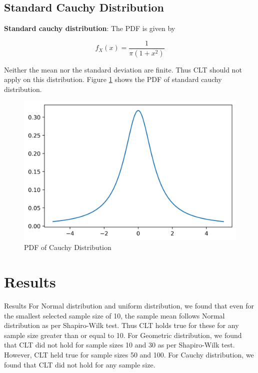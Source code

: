 \documentclass[10pt]{beamer}
\begin{document}
\begin{frame}{}
\subsection{Standard Cauchy Distribution}
\textbf{Standard cauchy distribution}: The PDF is given by
\begin{block}{}
$$f_X(x) = \dfrac{1}{\pi (1+x^2)}$$
\end{block}Neither the mean nor the standard deviation are finite. Thus CLT should not apply on this distribution. Figure \ref{cauchy_pdf} shows the PDF of standard cauchy distribution.
\end{frame}
\begin{frame}{}
    \begin{figure}[H]
        \centering
        \includegraphics[scale=0.4]{images/cauchy.png}
        \caption{PDF of Cauchy Distribution}
        \label{cauchy_pdf}
    \end{figure}
\end{frame}
\section{Results}
\begin{frame}{Results}
    For Normal distribution and uniform distribution, we found that even for the smallest selected sample size of 10, the sample mean follows Normal distribution as per Shapiro-Wilk test. Thus CLT holds true for these for any sample size greater than or equal to 10. For Geometric distribution, we found that CLT did not hold for sample sizes 10 and 30 as per Shapiro-Wilk test. However, CLT held true for sample sizes 50 and 100. For Cauchy distribution, we found that CLT did not hold for any sample size. 
\end{frame}
\end{document}
